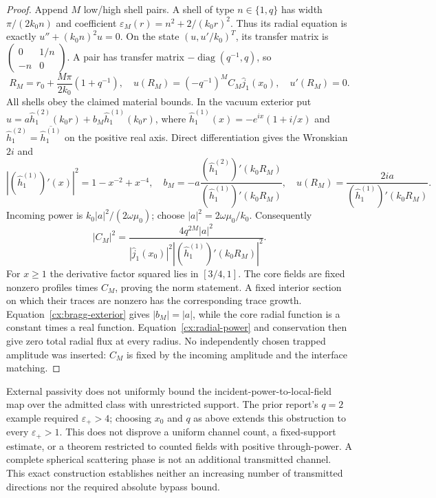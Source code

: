 \begin{proof}
Append $M$ low/high shell pairs. A shell of type $n\in\{1,q\}$ has
width $\pi/(2k_0n)$ and coefficient
$\varepsilon_M(r)=n^2+2/(k_0r)^2$. Thus its radial equation is exactly
$u''+(k_0n)^2u=0$. On the state $(u,u'/k_0)^T$, its transfer matrix is
$\left(\begin{smallmatrix}0&1/n\\-n&0\end{smallmatrix}\right)$.
A pair has transfer matrix $-\operatorname{diag}(q^{-1},q)$, so
\begin{equation}
 R_M=r_0+\frac{M\pi}{2k_0}(1+q^{-1}),\quad
 u(R_M)=(-q^{-1})^M C_M\widehat j_1(x_0),\quad u'(R_M)=0.
 \label{cx:bragg-transfer}
\end{equation}
All shells obey the claimed material bounds. In the vacuum exterior put
$u=a\widehat h^{(2)}_1(k_0r)+b_M\widehat h^{(1)}_1(k_0r)$, where
$\widehat h^{(1)}_1(x)=-e^{ix}(1+i/x)$ and
$\widehat h^{(2)}_1=\overline{\widehat h^{(1)}_1}$ on the positive real
axis. Direct differentiation gives the Wronskian $2i$ and
\begin{equation}
 |(\widehat h^{(1)}_1)'(x)|^2=1-x^{-2}+x^{-4},\quad
 b_M=-a\frac{(\widehat h^{(2)}_1)'(k_0R_M)}
                    {(\widehat h^{(1)}_1)'(k_0R_M)},\quad
 u(R_M)=\frac{2ia}{(\widehat h^{(1)}_1)'(k_0R_M)}.
 \label{cx:bragg-exterior}
\end{equation}
Incoming power is $k_0|a|^2/(2\omega\mu_0)$; choose
$|a|^2=2\omega\mu_0/k_0$. Consequently
\begin{equation}
 |C_M|^2=
 \frac{4q^{2M}|a|^2}{|\widehat j_1(x_0)|^2
             |(\widehat h^{(1)}_1)'(k_0R_M)|^2}.
 \label{cx:bragg-growth}
\end{equation}
For $x\geq1$ the derivative factor squared lies in $[3/4,1]$.
The core fields are fixed nonzero profiles times $C_M$, proving the
norm statement. A fixed interior section on which their traces are
nonzero has the corresponding trace growth. Equation~\eqref{cx:bragg-exterior}
gives $|b_M|=|a|$, while the core radial function is a constant times a
real function. Equation~\eqref{cx:radial-power} and conservation then give
zero total radial flux at every radius. No independently chosen trapped
amplitude was inserted: $C_M$ is fixed by the incoming amplitude and
the interface matching.
\end{proof}

\begin{remark}
\label{cx:bragg-scope}
External passivity does not uniformly bound the incident-power-to-local-field
map over the admitted class with unrestricted support. The prior report's
$q=2$ example required $\varepsilon_+>4$; choosing $x_0$ and $q$ as above
extends this obstruction to every $\varepsilon_+>1$. This does not disprove
a uniform channel count, a fixed-support estimate, or a theorem restricted
to counted fields with positive through-power. A complete spherical
scattering phase is not an additional transmitted channel. This exact
construction establishes neither an increasing number of transmitted
directions nor the required absolute bypass bound.
\end{remark}


